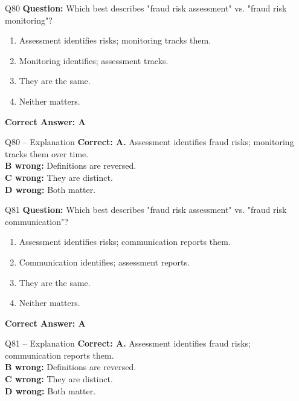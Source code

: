 \documentclass[aspectratio=169,10pt]{beamer}
\begin{document}
	\begin{frame}[t]{Q80}
		\small
		\textbf{Question:} Which best describes "fraud risk assessment" vs. "fraud risk monitoring"?
		\begin{enumerate}[label=\Alph*.,itemsep=1pt,topsep=2pt]
			\item Assessment identifies risks; monitoring tracks them.
			\item Monitoring identifies; assessment tracks.
			\item They are the same.
			\item Neither matters.
		\end{enumerate}
		\vspace{4pt}
		\textbf{Correct Answer: A}
	\end{frame}
	
	\begin{frame}[t]{Q80 -- Explanation}
		\small
		\textbf{Correct: A.} Assessment identifies fraud risks; monitoring tracks them over time. \\[4pt]
		\textbf{B wrong:} Definitions are reversed. \\[2pt]
		\textbf{C wrong:} They are distinct. \\[2pt]
		\textbf{D wrong:} Both matter.
	\end{frame}
	
	\begin{frame}[t]{Q81}
		\small
		\textbf{Question:} Which best describes "fraud risk assessment" vs. "fraud risk communication"?
		\begin{enumerate}[label=\Alph*.,itemsep=1pt,topsep=2pt]
			\item Assessment identifies risks; communication reports them.
			\item Communication identifies; assessment reports.
			\item They are the same.
			\item Neither matters.
		\end{enumerate}
		\vspace{4pt}
		\textbf{Correct Answer: A}
	\end{frame}
	
	\begin{frame}[t]{Q81 -- Explanation}
		\small
		\textbf{Correct: A.} Assessment identifies fraud risks; communication reports them. \\[4pt]
		\textbf{B wrong:} Definitions are reversed. \\[2pt]
		\textbf{C wrong:} They are distinct. \\[2pt]
		\textbf{D wrong:} Both matter.
	\end{frame}
	
\end{document}
